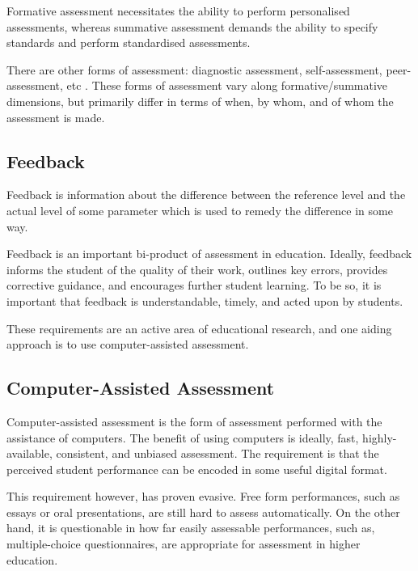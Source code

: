 Formative assessment necessitates the ability to perform personalised
assessments, whereas summative assessment demands the ability to specify
standards and perform standardised assessments.

There are other forms of assessment: diagnostic assessment, self-assessment,
peer-assessment, etc \cite{bull-mckenna-2004,topping-1998}.  These forms of
assessment vary along formative/summative dimensions, but primarily differ in
terms of when, by whom, and of whom the assessment is made.

\subsection{Feedback}

\label{section:assessment-in-computer-science:feedback}

Feedback is information about the difference between the reference level and
the actual level of some parameter which is used to remedy the difference in
some way\cite{ramaprasad1989}.

Feedback is an important bi-product of assessment in
education\cite{black-william-1998}. Ideally, feedback informs the student of
the quality of their work, outlines key errors, provides corrective guidance,
and encourages further student learning. To be so, it is important that
feedback is understandable, timely, and acted upon by
students\cite{gibbs-simpson-2004}.

These requirements are an active area of educational research, and one aiding
approach is to use computer-assisted assessment.

\subsection{Computer-Assisted Assessment}

Computer-assisted assessment is the form of assessment performed with the
assistance of computers\cite{conole-warburton-2005}. The benefit of using
computers is ideally, fast, highly-available, consistent, and unbiased
assessment\cite{ala-mutka-2005}. The requirement is that the perceived student
performance can be encoded in some useful digital format.

This requirement however, has proven evasive. Free form performances, such as
essays or oral presentations, are still hard to assess
automatically\cite{valenti-et-al-2003}.  On the other hand, it is questionable
in how far easily assessable performances, such as, multiple-choice
questionnaires, are appropriate for assessment in higher
education\cite{conole-warburton-2005}.

